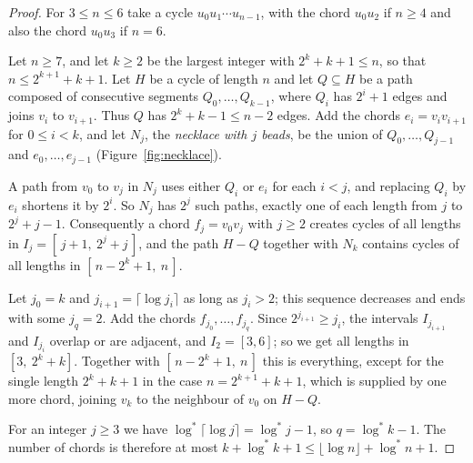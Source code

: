 \documentclass[11pt]{article}
\theoremstyle{definition}
\theoremstyle{remark}
\newcommand{\lgs}{\log^{*}}
\begin{document}
\begin{proof}
For $3\le n\le6$ take a cycle $u_0u_1\cdots u_{n-1}$, with the chord $u_0u_2$ if $n\ge4$ and also
the chord $u_0u_3$ if $n=6$.

Let $n\ge7$, and let $k\ge2$ be the largest integer with $2^{k}+k+1\le n$, so that
$n\le2^{k+1}+k+1$. Let $H$ be a cycle of length $n$ and let $Q\subseteq H$ be a path composed of
consecutive segments $Q_0,\dots,Q_{k-1}$, where $Q_i$ has $2^{i}+1$ edges and joins $v_i$ to
$v_{i+1}$. Thus $Q$ has $2^{k}+k-1\le n-2$ edges. Add the chords $e_i=v_iv_{i+1}$ for $0\le i<k$,
and let $N_j$, the \emph{necklace with $j$ beads}, be the union of $Q_0,\dots,Q_{j-1}$ and
$e_0,\dots,e_{j-1}$ (Figure~\ref{fig:necklace}).

A path from $v_0$ to $v_j$ in $N_j$ uses either $Q_i$ or $e_i$ for each $i<j$, and replacing $Q_i$ by
$e_i$ shortens it by $2^{i}$. So $N_j$ has $2^{j}$ such paths, exactly one of each length from $j$ to
$2^{j}+j-1$. Consequently a chord $f_j=v_0v_j$ with $j\ge2$ creates cycles of all lengths in
$I_j=[\,j+1,\ 2^{j}+j\,]$, and the path $H-Q$ together with $N_k$ contains cycles of all lengths in
$[\,n-2^{k}+1,\ n\,]$.

Let $j_0=k$ and $j_{i+1}=\lceil\log j_i\rceil$ as long as $j_i>2$; this sequence decreases and ends
with some $j_q=2$. Add the chords $f_{j_0},\dots,f_{j_q}$. Since $2^{j_{i+1}}\ge j_i$, the intervals
$I_{j_{i+1}}$ and $I_{j_i}$ overlap or are adjacent, and $I_2=[3,6]$; so we get all lengths in
$[3,\ 2^{k}+k]$. Together with $[\,n-2^{k}+1,\ n\,]$ this is everything, except for the single length
$2^{k}+k+1$ in the case $n=2^{k+1}+k+1$, which is supplied by one more chord, joining $v_k$ to
the neighbour of $v_0$ on $H-Q$.

For an integer $j\ge3$ we have $\lgs\lceil\log j\rceil=\lgs j-1$, so $q=\lgs k-1$. The number of
chords is therefore at most $k+\lgs k+1\le\lfloor\log n\rfloor+\lgs n+1$.
\end{proof}
\end{document}
